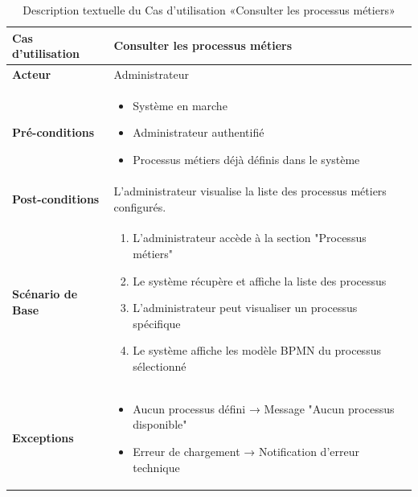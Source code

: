 \begin{table}[!ht]
    \begin{adjustwidth}{-2cm}{-2cm}
    \centering
    \caption{Description textuelle du Cas d'utilisation «Consulter les processus métiers»}
    \label{tab:consult_business_processes}
    \renewcommand{\arraystretch}{1.2}
    \begin{tabular}{|p{4.2cm}|p{13cm}|}
    \hline
    \textbf{Cas d'utilisation} & Consulter les processus métiers \\
    \hline
    \textbf{Acteur} & Administrateur \\
    \hline
    \textbf{Pré-conditions} & 
    \begin{itemize}
    \item Système en marche
    \item Administrateur authentifié
    \item Processus métiers déjà définis dans le système
    \end{itemize} \\
    \hline
    \textbf{Post-conditions} & L'administrateur visualise la liste des processus métiers configurés. \\
    \hline
    \textbf{Scénario de Base} & 
    \begin{enumerate}
    \item L'administrateur accède à la section "Processus métiers"
    \item Le système récupère et affiche la liste des processus
    \item L'administrateur peut visualiser un processus spécifique
    \item Le système affiche les modèle BPMN du processus sélectionné
    \end{enumerate} \\
    \hline
    \textbf{Exceptions} & 
    \begin{itemize}
    \item Aucun processus défini → Message "Aucun processus disponible"
    \item Erreur de chargement → Notification d'erreur technique
    \end{itemize} \\
    \hline
    \end{tabular}
    \end{adjustwidth}
    \end{table}
